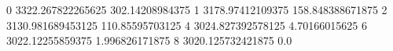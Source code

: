0 3322.267822265625 302.14208984375
1 3178.97412109375 158.848388671875
2 3130.981689453125 110.85595703125
4 3024.827392578125 4.70166015625
6 3022.12255859375 1.996826171875
8 3020.125732421875 0.0

